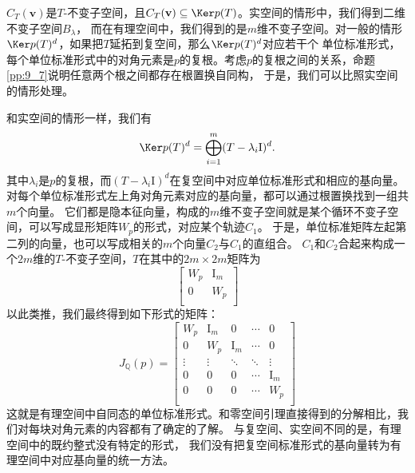 \documentclass[12pt,UTF8,fontset=none]{ctexbook}
\begin{document}
$C_T(\mathbf{v})$是$T$-不变子空间，且$C_T(\mathbf{v})\subseteq\Ker p(T)$。实空间的情形中，我们得到二维不变子空间$B_\lambda$，
而在有理空间中，我们得到的是$m$维不变子空间。对一般的情形$\Ker p(T)^{d}$，如果把$T$延拓到复空间，那么$\Ker p(T)^{d}$对应若干个
单位标准形式，每个单位标准形式中的对角元素是$p$的复根。考虑$p$的复根之间的关系，命题\ref{pp:9_7}说明任意两个根之间都存在根置换自同构，
于是，我们可以比照实空间的情形处理。

和实空间的情形一样，我们有
$$\Ker p(T)^{d} = \bigoplus_{i=1}^m (T - \lambda_i \mathrm{I})^d. $$
其中$\lambda_i$是$p$的复根，而$(T - \lambda_i \mathrm{I})^d$在复空间中对应单位标准形式和相应的基向量。
对每个单位标准形式左上角对角元素对应的基向量，都可以通过根置换找到一组共$m$个向量。
它们都是隐本征向量，构成的$m$维不变子空间就是某个循环不变子空间，可以写成显形矩阵$W_p$的形式，对应某个轨迹$C_1$。
于是，单位标准矩阵左起第二列的向量，也可以写成相关的$m$个向量$C_2$与$C_1$的直组合。
$C_1$和$C_2$合起来构成一个$2m$维的$T$-不变子空间，$T$在其中的$2m\times 2m$矩阵为
$$ \begin{bmatrix}
    W_p & \mathrm{I}_m \\
    0 & W_p \\
   \end{bmatrix} $$
以此类推，我们最终得到如下形式的矩阵：
$$ J_\mathbb{Q}(p) = \begin{bmatrix}
    W_p & \mathrm{I}_m & 0 & \cdots & 0 \\
    0 & W_p & \mathrm{I}_m & \cdots & 0 \\
    \vdots & \vdots & \ddots & \ddots & \vdots  \\
    0 & 0 & 0 & \cdots & \mathrm{I}_m  \\
    0 & 0 & 0 & \cdots & W_p \\
   \end{bmatrix} $$
这就是有理空间中自同态的单位标准形式。和零空间引理直接得到的分解相比，我们对每块对角元素的内容都有了确定的了解。
与复空间、实空间不同的是，有理空间中的既约整式没有特定的形式，
我们没有把复空间标准形式的基向量转为有理空间中对应基向量的统一方法。


\end{document}
